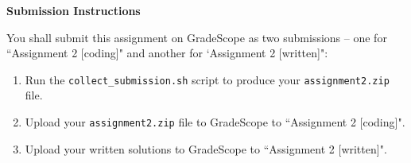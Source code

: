 \Large{\textbf{Submission Instructions}}

\normalsize
You shall submit this assignment on GradeScope as two submissions -- one for ``Assignment 2 [coding]" and another for `Assignment 2 [written]":
\begin{enumerate}
    \item Run the \texttt{collect\_submission.sh} script to produce your \texttt{assignment2.zip} file.
    \item Upload your \texttt{assignment2.zip} file to GradeScope to ``Assignment 2 [coding]".
    \item Upload your written solutions to GradeScope to ``Assignment 2 [written]".
\end{enumerate}